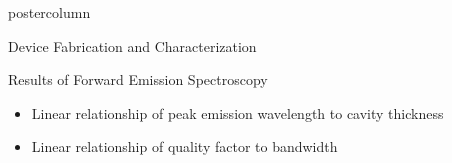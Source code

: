 \documentclass[10pt,papersize={24in,36in}]{beamer}
\begin{document}
\begin{frame}
\begin{columns}
\begin{column}{.49\textwidth}
\begin{beamercolorbox}[center,wd=\textwidth]{postercolumn}
\begin{minipage}[T]{.95\textwidth}
{\begin{block}{Device Fabrication and Characterization}
            \end{block}
			\vfill
            \begin{block}{Results of Forward Emission Spectroscopy}
                \begin{minipage}{0.35\textwidth}
                    \begin{itemize}
                     \item Linear relationship of peak emission wavelength to cavity thickness
                     \item Linear relationship of quality factor to bandwidth
                    \end{itemize}
                \end{minipage}
                \begin{minipage}{0.55\textwidth}
                    \centering

\end{minipage}
\end{block}}
\end{minipage}
\end{beamercolorbox}
\end{column}
\end{columns}
\end{frame}
\end{document}

